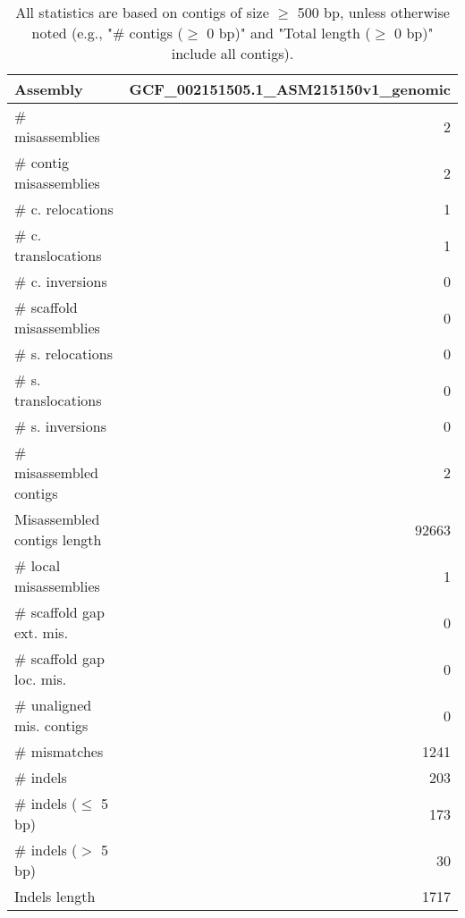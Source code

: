 \documentclass[12pt,a4paper]{article}
\begin{document}
\begin{table}[ht]
\begin{center}
\caption{All statistics are based on contigs of size $\geq$ 500 bp, unless otherwise noted (e.g., "\# contigs ($\geq$ 0 bp)" and "Total length ($\geq$ 0 bp)" include all contigs).}
\begin{tabular}{|l*{1}{|r}|}
\hline
Assembly & GCF\_002151505.1\_ASM215150v1\_genomic \\ \hline
\# misassemblies & 2 \\ \hline
\hspace{2mm}\# contig misassemblies & 2 \\ \hline
\hspace{5mm}\# c. relocations & 1 \\ \hline
\hspace{5mm}\# c. translocations & 1 \\ \hline
\hspace{5mm}\# c. inversions & 0 \\ \hline
\hspace{2mm}\# scaffold misassemblies & 0 \\ \hline
\hspace{5mm}\# s. relocations & 0 \\ \hline
\hspace{5mm}\# s. translocations & 0 \\ \hline
\hspace{5mm}\# s. inversions & 0 \\ \hline
\# misassembled contigs & 2 \\ \hline
Misassembled contigs length & 92663 \\ \hline
\# local misassemblies & 1 \\ \hline
\# scaffold gap ext. mis. & 0 \\ \hline
\# scaffold gap loc. mis. & 0 \\ \hline
\# unaligned mis. contigs & 0 \\ \hline
\# mismatches & 1241 \\ \hline
\# indels & 203 \\ \hline
\hspace{5mm}\# indels ($\leq$ 5 bp) & 173 \\ \hline
\hspace{5mm}\# indels ($>$ 5 bp) & 30 \\ \hline
Indels length & 1717 \\ \hline
\end{tabular}
\end{center}
\end{table}
\end{document}
